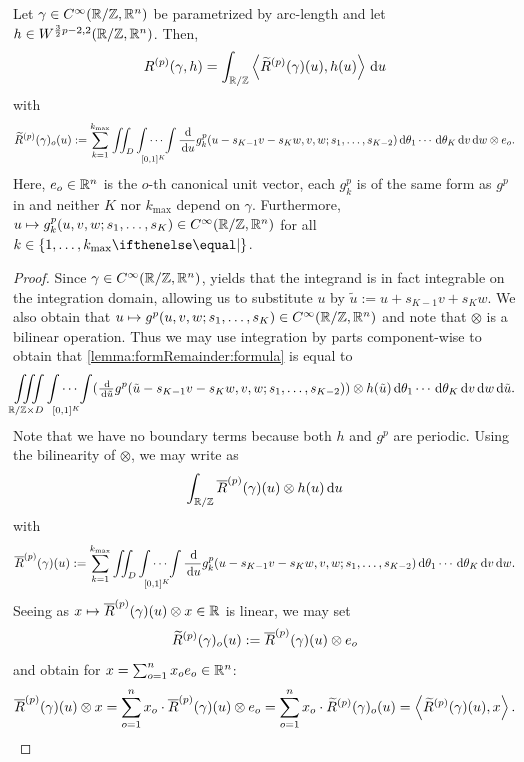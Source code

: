 \begin{lemma}
    \label{lemma:L2formRemainder}
    Let $\gamma \in C^\infty(\mathbb{R}/\mathbb{Z},\mathbb{R}^n)$ be parametrized by arc-length and let $h \in W^{\frac 3 2 p -2,2}(\mathbb{R}/\mathbb{Z},\mathbb{R}^n)$. 
    Then,
    \[
        R^{(p)}(\gamma,h)=\int_{\mathbb{R}/\mathbb{Z}} \left<\widetilde R^{(p)}(\gamma)(u), h(u)\right>  \,\mathrm{d} u
    \]
    with
    \[	
        \widetilde R^{(p)}(\gamma)_o(u) := \sum_{k=1}^{k_{\max}} \iint_{D} \idotsint\limits_{[0,1]^K} \frac {\,\mathrm{d}} {\,\mathrm{d} u} g^p_k(u - s_{K-1}v - s_K w,v,w;s_{1},\dots,s_{K-2}) \,\mathrm{d}\theta_{1}\cdots\,\mathrm{d}\theta_{K}\,\mathrm{d} v \,\mathrm{d} w \otimes e_o.
    \]
    Here, $e_o \in \mathbb{R}^n$ is the $o$-th canonical unit vector, each $g^p_k$ is of the same form as $g^p$ in  and neither $K$ nor $k_{\max}$ depend on $\gamma$.
    Furthermore, $u \mapsto g^p_k(u,v,w;s_1,\ldots,s_K) \in C^\infty(\mathbb{R}/\mathbb{Z},\mathbb{R}^n)$ for all $k \in \set{1,\ldots,k_{\max}}$.
\end{lemma}
\begin{proof}
	Since $\gamma \in C^\infty(\mathbb{R}/\mathbb{Z},\mathbb{R}^n)$,  yields that the integrand is in fact integrable on the integration domain, allowing us to substitute $u$ by $\tilde u := u +s_{K-1}v + s_K w$.
	We also obtain that $u \mapsto g^p(u,v,w;s_1,\ldots,s_K) \in C^\infty(\mathbb{R}/\mathbb{Z},\mathbb{R}^n)$ and note that $\otimes$ is a bilinear operation. Thus we may use integration by parts component-wise to obtain that \eqref{lemma:formRemainder:formula} is equal to
	\[
	\iiint\limits_{\mathbb R / \mathbb Z \times D} \idotsint\limits_{[0,1]^K} (\tfrac {\,\mathrm{d}} {\,\mathrm{d} \tilde u} g^p(\tilde u - s_{K-1}v - s_K w,v,w;s_{1},\dots,s_{K-2}) ) \otimes h(\tilde u)
	\,\mathrm{d}\theta_{1}\cdots\,\mathrm{d}\theta_{K}\,\mathrm{d} v \,\mathrm{d} w \,\mathrm{d} \tilde u.
	\]
	Note that we have no boundary terms because both $h$ and $g^p$ are periodic.
	Using the bilinearity of $\otimes$, we may write \Rpt{} as
    \[
        \int_{\mathbb{R}/\mathbb{Z}} \overline{R}^{(p)}(\gamma)(u) \otimes h(u) \,\mathrm{d} u 
    \]
    with
    \[
        \overline{R}^{(p)}(\gamma)(u) := \sum_{k=1}^{k_{\max}} \iint_{D} \idotsint\limits_{[0,1]^K} \frac {\,\mathrm{d}} {\,\mathrm{d} u} g^p_k(u - s_{K-1}v - s_K w,v,w;s_{1},\dots,s_{K-2}) \,\mathrm{d}\theta_{1}\cdots\,\mathrm{d}\theta_{K}\,\mathrm{d} v \,\mathrm{d} w.
    \]
    Seeing as $x \mapsto \overline{R}^{(p)}(\gamma)(u) \otimes x \in \mathbb{R}$ is linear, we may set
    \[
        \widetilde R^{(p)}(\gamma)_o(u) := \overline{R}^{(p)}(\gamma)(u) \otimes e_o
    \]
    and obtain for $x = \sum_{o=1}^n x_oe_o \in \mathbb{R}^n$:
    \[
        \overline{R}^{(p)}(\gamma)(u) \otimes x = \sum_{o=1}^n x_o \cdot \overline{R}^{(p)}(\gamma)(u) \otimes e_o = \sum_{o=1}^n x_o \cdot \widetilde R^{(p)}(\gamma)_o(u) = \left<\widetilde R^{(p)}(\gamma)(u),x\right>.
    \]
\end{proof}


